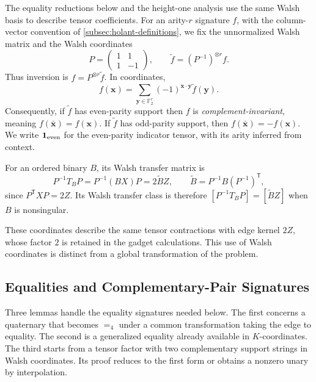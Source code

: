 \documentclass[11pt,letterpaper,onecolumn]{article}
\theoremstyle{plain}
\theoremstyle{definition}
\theoremstyle{remark}
\newcommand{\Ftwo}{\mathbb F_2}
\newcommand{\Eq}{=}
\begin{document}
The equality reductions below and the height-one analysis use the same
Walsh basis to describe tensor coefficients.
For an arity-\(r\) signature \(f\), with the column-vector convention of
\cref{subsec:holant-definitions}, we fix
	the unnormalized Walsh matrix and the Walsh coordinates
	\begin{equation}
		P=\begin{pmatrix}1&1\\1&-1\end{pmatrix},
		\qquad
		\widetilde f=(P^{-1})^{\otimes r}f.
		\label{eq:Walsh-coordinates}
	\end{equation}
	Thus inversion is \(f=P^{\otimes r}\widetilde f\).  In coordinates,
	\[
	f({\mathbf x})=\sum_{{\mathbf y}\in\Ftwo^r}(-1)^{{\mathbf x}\cdot {\mathbf y}}\widetilde f({\mathbf y}).
	\]
	Consequently, if \(\widetilde f\) has even-parity support then \(f\) is
\emph{complement-invariant}, meaning \(f(\bar {\mathbf x})=f({\mathbf x})\).
If \(\widetilde f\) has odd-parity support, then \(f(\bar {\mathbf x})=-f({\mathbf x})\).  We write \(\mathbf1_{\rm even}\) for the even-parity indicator tensor,
    with its arity inferred from context.

For an ordered binary \(B\), its Walsh transfer matrix is
\[
P^{-1}T_BP=P^{-1}(BX)P=2\widetilde BZ,
\qquad \widetilde B=P^{-1}B(P^{-1})^{\mathsf T},
\]
since \(P^{\mathsf T}XP=2Z\). Its Walsh transfer class is therefore
\([P^{-1}T_BP]=[\widetilde BZ]\) when \(B\) is nonsingular.
	
	
	These coordinates describe the same tensor contractions with edge kernel \(2Z\),
    whose factor \(2\) is retained in the gadget calculations.
    This use of Walsh coordinates is distinct from a global transformation of the problem.

    \subsection{Equalities and Complementary-Pair Signatures}
	\label{proofsubsec:equality-anchor}

Three lemmas handle the equality signatures needed below.  The first
concerns a quaternary that becomes
\(\Eq_4\) under a common transformation taking the edge to equality.
The second is a generalized equality already available in
\(K\)-coordinates.  The third starts from a tensor factor with two
complementary support strings in Walsh coordinates. Its proof reduces to
the first form or obtains a
nonzero unary by interpolation.
	
	
	
\end{document}
